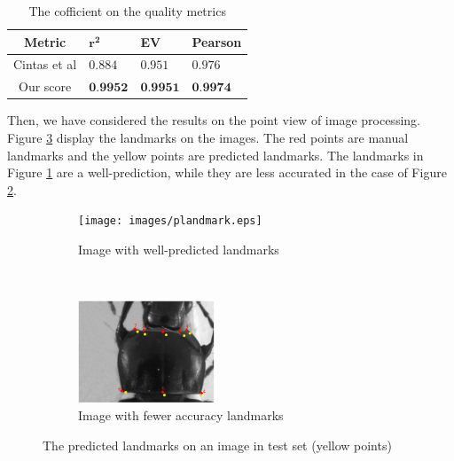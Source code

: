 \documentclass{article} %
\begin{document}
\begin{multicols}{2}
\begin{table}[H]
	\centering
	\begin{tabular}{|c|p{1cm}|p{1cm}|p{1.5cm}|}
		\hline
		Metric & $\mathbf{r^{2}}$ & \textbf{EV} & \textbf{Pearson} \\ \hline
		Cintas et al & $0.884$ & $0.951$ & $0.976$ \\ \hline
		Our score & $\textbf{0.9952}$ & $\textbf{0.9951}$ & $\textbf{0.9974}$ \\ \hline
	\end{tabular}
	\caption{\footnotesize{The cofficient on the quality metrics}}
	\label{table1}
\end{table}

Then, we have considered the results on the point view of image processing. Figure \ref{figresult1} display the landmarks on the images. The red points are manual landmarks and the yellow points are predicted landmarks. The landmarks in Figure \ref{figsubrs1} are a well-prediction, while they are less accurated in the case of Figure \ref{figsubrs2}.

\begin{figure}[H]
    \centering
    \begin{subfigure}[t]{0.25\textwidth}
        \centering
        \texttt{[image: images/plandmark.eps]}
        \caption{\footnotesize{Image with well-predicted landmarks}}
        \label{figsubrs1}
    \end{subfigure}%
    ~ 
    \begin{subfigure}[t]{0.25\textwidth}
        \centering
        \includegraphics[height=1.2in]{images/plandmark2.eps}
        \caption{\footnotesize{Image with fewer accuracy landmarks}}
        \label{figsubrs2}
    \end{subfigure}
    \caption{\footnotesize{The predicted landmarks on an image in test set (yellow points)}}
    \label{figresult1}
\end{figure}


\end{multicols}
\end{document}
